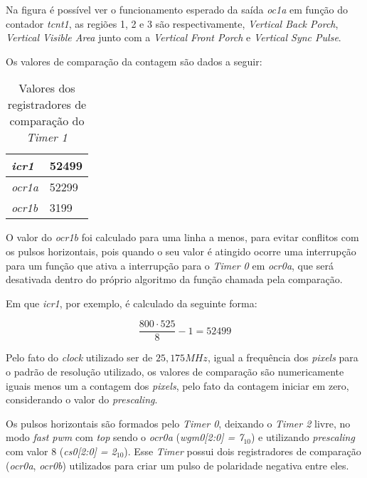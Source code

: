 \documentclass[twocolumn]{article}
\begin{document}
        

        Na figura é possível ver o funcionamento esperado da saída \textsl{oc1a} em função do contador \textsl{tcnt1}, as regiões 1, 2 e 3 são respectivamente, \textsl{Vertical Back Porch}, \textsl{Vertical Visible Area} junto com a \textsl{Vertical Front Porch} e \textsl{Vertical Sync Pulse}. %

        Os valores de comparação da contagem são dados a seguir:
        
        \begin{table}[H]
            \centering
            \begin{tabular}{l l}           \hline
                \textsl{icr1}   & 52499 \\ \hline
                \textsl{ocr1a}  & 52299 \\ \hline
                \textsl{ocr1b}  & 3199  \\ \hline
            \end{tabular}
            \caption{Valores dos registradores de comparação do \textsl{Timer 1}}
            \label{tab:val_timer_1_Hsync}
        \end{table}

        O valor do \textsl{ocr1b} foi calculado para uma linha a menos, para evitar conflitos com os pulsos horizontais, pois quando o seu valor é atingido ocorre uma interrupção para um função que ativa a interrupção para o \textsl{Timer 0} em \textsl{ocr0a}, que será desativada dentro do próprio algoritmo da função chamada pela comparação.

        Em que \textsl{icr1}, por exemplo, é calculado da seguinte forma:
        
        \begin{equation}
            \frac{800 \cdot 525}{8} - 1 = 52499
        \end{equation}
        
        Pelo fato do \textsl{clock} utilizado ser de \(25{,}175 MHz\), igual a frequência dos \textsl{pixels} para o padrão de resolução utilizado, os valores de comparação são numericamente iguais menos um a contagem dos \textsl{pixels}, pelo fato da contagem iniciar em zero, considerando o valor do \textsl{prescaling}.
        
        Os pulsos horizontais são formados pelo \textsl{Timer 0}, deixando o \textsl{Timer 2} livre, no modo \textsl{fast pwm} com \textsl{top} sendo o \textsl{ocr0a} (\textsl{wgm0[2:0] = 7\(_{10}\)}) e utilizando \textsl{prescaling} com valor 8 (\textsl{cs0[2:0] = 2\(_{10}\)}). Esse \textsl{Timer} possui dois registradores de comparação (\textsl{ocr0a}, \textsl{ocr0b}) utilizados para criar um pulso de polaridade negativa entre eles.
\end{document}

